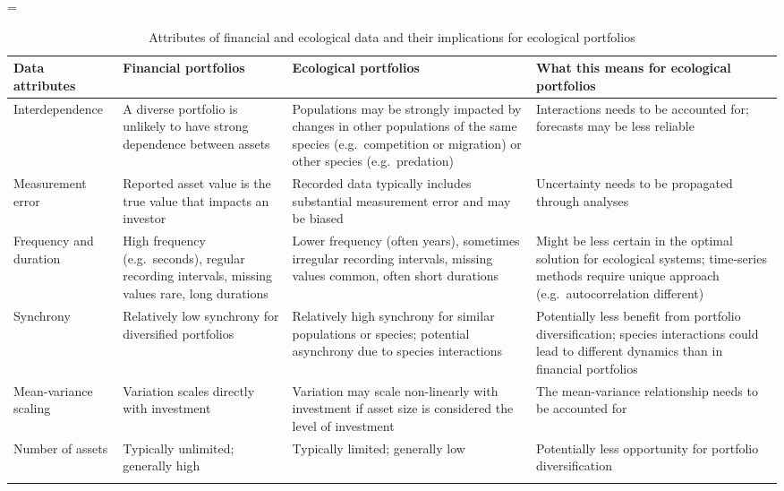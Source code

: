 \LTcapwidth=\textwidth
{}
\singlespacing
\begin{footnotesize}

\begin{longtable}{>{\RaggedRight}p{2.7cm}>{\RaggedRight}p{3.3cm}>{\RaggedRight}p{3.9cm}>{\RaggedRight}p{4.2cm}}

\caption{Attributes of financial and ecological data and their implications for ecological portfolios}\\
\toprule

\textbf{Data attributes} &
\textbf{Financial portfolios} &
\textbf{Ecological portfolios} &
\textbf{What this means for ecological portfolios}\\

\midrule

Interdependence &
A diverse portfolio is unlikely to have strong dependence between assets &
Populations may be strongly impacted by changes in other populations of the same species (e.g.\ competition or migration) or other species (e.g.\ predation) &
Interactions needs to be accounted for; forecasts may be less reliable\\

Measurement error &
Reported asset value is the true value that impacts an investor &
Recorded data typically includes substantial measurement error and may be biased &
Uncertainty needs to be propagated through analyses\\

Frequency and duration &
High frequency (e.g.\ seconds), regular recording intervals, missing values rare, long durations &
Lower frequency (often years), sometimes irregular recording intervals, missing values common, often short durations &
Might be less certain in the optimal solution for ecological systems; time-series methods require unique approach (e.g.\ autocorrelation different)\\

Synchrony &
Relatively low synchrony for diversified portfolios &
Relatively high synchrony for similar populations or species; potential asynchrony due to species interactions &
Potentially less benefit from portfolio diversification; species interactions could lead to different dynamics than in financial portfolios\\

Mean-variance scaling &
Variation scales directly with investment &
Variation may scale non-linearly with investment if asset size is considered the level of investment &
The mean-variance relationship needs to be accounted for\\

Number of assets &
Typically unlimited; generally high &
Typically limited; generally low &
Potentially less opportunity for portfolio diversification\\

\bottomrule
\label{tab:data}
\end{longtable}
\end{footnotesize}
